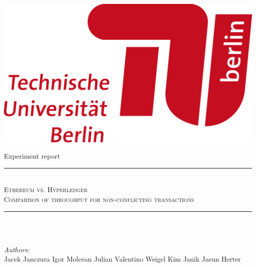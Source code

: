 \documentclass[12pt]{article}
\makeatletter
\let\thetitle\@title
\makeatother
\begin{document}

\begin{titlepage}
	\centering
    
    \includegraphics[scale = 0.75]{img/Logo.png} \\[1.0 cm]
    
    \vspace{4 cm}
    
    {\LARGE Experiment report} \\[0.2 cm]
    
    \vspace{1 cm}
    
    \rule{\linewidth}{0.2 mm} \\[0.4 cm]
    
	\textsc{\LARGE Ethereum vs. Hyperledger}\\[0.2 cm]
	\textsc{\lARGE Comparison of throughput for non-conflicting transactions} \\[0.2 cm]
	\rule{\linewidth}{0.2 mm} \\[0.4 cm]
	
	{\huge \bfseries \thetitle}\\
	
	\vspace{2 cm}
	
	\begin{minipage}{0.4\textwidth}
		
		\begin{flushleft} 
			\emph{Authors:} \\
			Jacek Janczura \linebreak
			Igor Molcean \linebreak
			Julian Valentino Weigel \linebreak
			Kim Janik Jasun Herter
		\end{flushleft}
	\end{minipage}\\[2 cm]
	

 
	\vfill
	
\end{titlepage}
\end{document}
